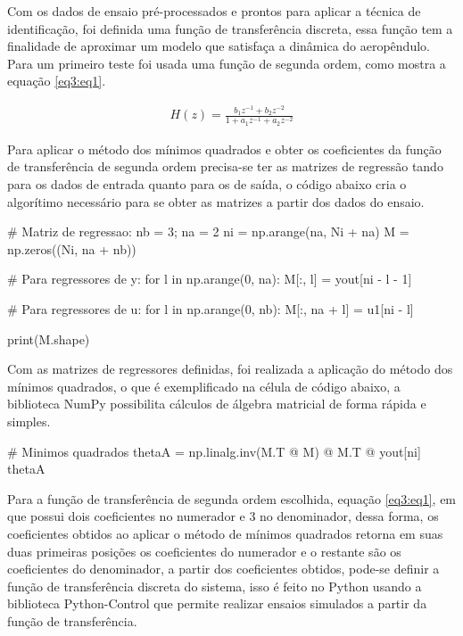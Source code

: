 Com os dados de ensaio pré-processados e prontos para aplicar a técnica de identificação, foi definida uma função de transferência discreta, essa função tem a finalidade de aproximar um modelo que satisfaça a dinâmica do aeropêndulo. Para um primeiro teste foi usada uma função de segunda ordem, como mostra a equação \ref{eq3:eq1}.

\begin{align}
    H(z) = \frac{b_1z^{-1}+b_2z^{-2}}
    {1+a_1z^{-1}+a_2z^{-2}} \label{eq3:eq1}
\end{align}

Para aplicar o método dos mínimos quadrados e obter os coeficientes da função de transferência de segunda ordem precisa-se ter as matrizes de regressão tando para os dados de entrada quanto para os de saída, o código abaixo cria o algorítimo necessário para se obter as matrizes a partir dos dados do ensaio.

\vspace{0.5cm}

\begin{python}
# Matriz de regressao:
nb = 3; na = 2
ni = np.arange(na, Ni + na)
M = np.zeros((Ni, na + nb))

# Para regressores de y:
for l in np.arange(0, na):
  M[:, l] = yout[ni - l - 1]

# Para regressores de u:
for l in np.arange(0, nb):
  M[:, na + l] = u1[ni - l]

print(M.shape)
\end{python}

Com as matrizes de regressores definidas, foi realizada a aplicação do método dos mínimos quadrados, o que é exemplificado na célula de código abaixo, a biblioteca NumPy possibilita cálculos de álgebra matricial de forma rápida e simples.

\vspace{0.5cm}

\begin{python}
# Minimos quadrados
thetaA = np.linalg.inv(M.T @ M) @ M.T @ yout[ni]
thetaA
\end{python}

Para a função de transferência de segunda ordem escolhida, equação \ref{eq3:eq1}, em que possui dois coeficientes no numerador e 3 no denominador, dessa forma, os coeficientes obtidos ao aplicar o método de mínimos quadrados retorna em suas duas primeiras posições os coeficientes do numerador e o restante são os coeficientes do denominador, a partir dos coeficientes obtidos, pode-se definir a função de transferência discreta do sistema, isso é feito no Python usando a biblioteca Python-Control que permite realizar ensaios simulados a partir da função de transferência.

